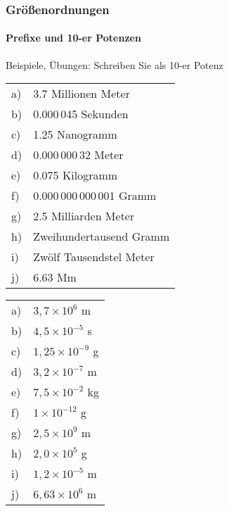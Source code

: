 \begin{frame}
  \frametitle{Gr\"o\ss{}enordnungen}
  \framesubtitle{Prefixe und 10-er Potenzen}
  \begin{block}{Beispiele, \"Ubungen: Schreiben Sie als 10-er Potenz}
    \pause
    \parbox[t]{0.4\linewidth}{%
    \ifteacher\begin{tabular}{@{}l*{1}{@{\,}l}@{}}
      a) & 3.7 Millionen Meter        \tabularnewline\pause
      b) & 0.000\,045 Sekunden        \tabularnewline\pause
      c) & 1.25 Nanogramm             \tabularnewline\pause
      d) & 0.000\,000\,32 Meter       \tabularnewline\pause
      e) & 0.075 Kilogramm            \tabularnewline\pause
      f) & 0.000\,000\,000\,001 Gramm \tabularnewline\pause
      g) & 2.5 Milliarden Meter       \tabularnewline\pause
      h) & Zweihundertausend Gramm    \tabularnewline\pause
      i) & Zw\"olf Tausendstel Meter  \tabularnewline\pause
      j) & 6.63 Mm                    \tabularnewline
    \end{tabular}
    \else\rule[0pt]{0pt}{16\baselineskip}
    \fi
    }\pause%
    \parbox[t]{0.4\linewidth}{%
    \ifteacher\begin{tabular}{@{}l*{1}{@{\,}l}@{}}
      a) & $3{,}7 \times 10^6$ m     \tabularnewline
      b) & $4{,}5 \times 10^{-5}$ s  \tabularnewline
      c) & $1{,}25 \times 10^{-9}$ g \tabularnewline
      d) & $3{,}2 \times 10^{-7}$ m  \tabularnewline
      e) & $7{,}5 \times 10^{-2}$ kg \tabularnewline
      f) & $1 \times 10^{-12}$ g     \tabularnewline
      g) & $2{,}5 \times 10^9$ m     \tabularnewline
      h) & $2{,}0 \times 10^5$ g     \tabularnewline
      i) & $1{,}2 \times 10^{-5}$ m  \tabularnewline
      j) & $6{,}63 \times 10^6$ m    \tabularnewline
    \end{tabular}\pause
    \else\rule[0pt]{0pt}{7\baselineskip}
    \fi
    }\pause 
  \end{block} 
\end{frame}

